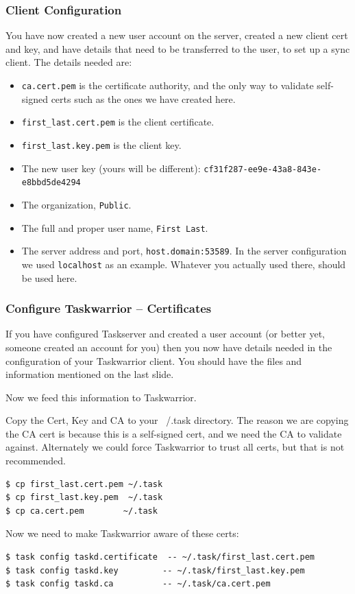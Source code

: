 \documentclass[t,handout]{beamer}
\begin{document}
\begin{frame}[fragile]\frametitle{Client Configuration}
    You have now created a new user account on the server, created a new client cert and key, and have details that need to be transferred to the user, to set up a sync client.  The details needed are:

    \begin{itemize}
        \item \verb+ca.cert.pem+ is the certificate authority, and the only way to validate self-signed certs such as the ones we have created here.
        \item \verb+first_last.cert.pem+ is the client certificate.
        \item \verb+first_last.key.pem+ is the client key.
        \item The new user key (yours will be different): \verb+cf31f287-ee9e-43a8-843e-e8bbd5de4294+
        \item The organization, \verb+Public+.
        \item The full and proper user name, \verb+First Last+.
        \item The server address and port, \verb+host.domain:53589+. In the server configuration we used \verb+localhost+ as an example. Whatever you actually used there, should be used here.
  \end{itemize}
\end{frame}

\begin{frame}[fragile]\frametitle{Configure Taskwarrior -- Certificates}

    If you have configured Taskserver and created a user account (or better yet, someone created an account for you) then you now have details needed in the configuration of your Taskwarrior client. You should have the files and information mentioned on the last slide.

    Now we feed this information to Taskwarrior.

    Copy the Cert, Key and CA to your ~/.task directory.  The reason we are copying the CA cert is because this is a self-signed cert, and we need the CA to validate against.  Alternately we could force Taskwarrior to trust all certs, but that is not recommended.

    \begin{lstlisting}
$ cp first_last.cert.pem ~/.task
$ cp first_last.key.pem  ~/.task
$ cp ca.cert.pem        ~/.task\end{lstlisting}

    Now we need to make Taskwarrior aware of these certs:

    \begin{lstlisting}
$ task config taskd.certificate  -- ~/.task/first_last.cert.pem
$ task config taskd.key         -- ~/.task/first_last.key.pem
$ task config taskd.ca          -- ~/.task/ca.cert.pem\end{lstlisting}
\end{frame}
\end{document}

